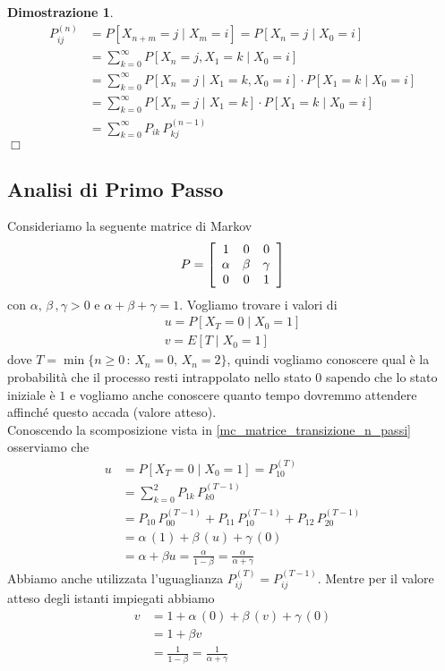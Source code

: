 \documentclass{article}
\newtheorem*{dimostrazione*}{Dimostrazione}
\newcommand*{\QED}{\hfill\ensuremath{\Box}}
\begin{document}
\begin{dimostrazione*}
\begin{align*}
P_{ij}^{(n)} &= P[X_{n+m} = j \mid X_m = i] = P[X_n = j \mid X_0 = i]\\ 
&= \sum_{k = 0}^{\infty} P[X_n = j, X_1 = k \mid X_0 = i]\\
&=\sum_{k = 0}^{\infty} P[X_n = j \mid X_1 = k, X_0 = i]\cdot P[X_1 = k \mid X_0 =i]\\
&=\sum_{k =0 }^{\infty} P[X_n = j \mid X_1 = k] \cdot P[X_1 = k \mid X_0 = i]\\
&=\sum_{k = 0}^{\infty} P_{ik}\,P_{kj}^{(n-1)}
\end{align*}
\QED
\end{dimostrazione*}

\subsection{Analisi di Primo Passo}

Consideriamo la seguente matrice di Markov
\begin{align*}
P = \left[\begin{array}{c c c}
1 & 0 & 0\\
\alpha & \beta & \gamma\\
0 & 0 & 1
\end{array}
\right]
\end{align*}
con $\alpha,\,\beta\,,\gamma > 0$ e $\alpha + \beta + \gamma = 1$.
Vogliamo trovare i valori di
\begin{gather*}
u = P[X_T = 0 \mid X_0 = 1]\\
v = E[T \mid X_0 = 1]
\end{gather*}
dove $T = \min\{n \ge 0\,:\,X_n = 0,\,X_n = 2\}$, quindi vogliamo conoscere qual è la probabilità che il processo resti intrappolato nello stato $0$ sapendo che lo stato iniziale è $1$ e vogliamo anche conoscere quanto tempo dovremmo attendere affinché questo accada (valore atteso).\\

Conoscendo la scomposizione vista in \ref{mc_matrice_transizione_n_passi} osserviamo che
\begin{align*}
u &= P[X_T = 0 \mid X_0 = 1] = P_{10}^{(T)}\\
&= \sum_{k = 0}^2 P_{1k}\,P_{k0}^{(T-1)}\\
&= P_{10}\,P_{00}^{(T-1)} + P_{11}\,P_{10}^{(T-1)} + P_{12}\,P_{20}^{(T-1)}\\
&= \alpha\,(1) + \beta\,(u) + \gamma\,(0)\\
&= \alpha + \beta u = \frac{\alpha}{1-\beta} = \frac{\alpha}{\alpha + \gamma}
\end{align*}
Abbiamo anche utilizzata l'uguaglianza $P_{ij}^{(T)} = P_{ij}^{(T-1)}$. Mentre per il valore atteso degli istanti impiegati abbiamo
\begin{align*}
v &= 1 + \alpha\,(0) + \beta\,(v) + \gamma\,(0)\\
&= 1 + \beta v\\
&= \frac{1}{1 - \beta} = \frac{1}{\alpha + \gamma}
\end{align*}\\
\end{document}

